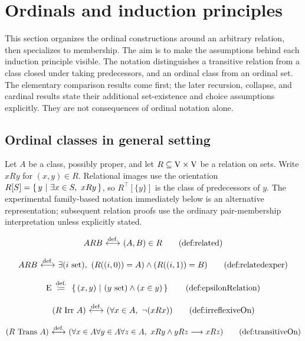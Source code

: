 \def\topic{Ordinals}

\section{Ordinals and induction principles}
This section organizes the ordinal constructions around an arbitrary
relation, then specializes to membership. The aim is to make the assumptions
behind each induction principle visible. The notation distinguishes a
transitive relation from a class closed under taking predecessors, and an
ordinal class from an ordinal set. The elementary comparison results come
first; the later recursion, collapse, and cardinal results state their
additional set-existence and choice assumptions explicitly. They are not
consequences of ordinal notation alone.
\subsection{Ordinal classes in general setting}
Let $A$ be a class, possibly proper, and let
$R\subseteq\mathrm{V}\times\mathrm{V}$ be a relation on sets. Write $xRy$ for
$(x,y)\in R$. Relational images use the orientation
$R[S]=\left\{\,y\ \middle|\ \exists x\in S,\ xRy\,\right\}$, so $R^\top[\{y\}]$ is the class of
predecessors of $y$. The experimental family-based notation immediately
below is an alternative representation; subsequent relation proofs use
the ordinary pair-membership interpretation unless explicitly stated.
\begin{definition}[related]
\[
ARB \iffdef (A,B) \in R
\labeltagd{def}{related}
\]
\end{definition}
\begin{definition*}
\[
ARB \iffdef \exists (i\set),\ (R((i,0))=A)\land(R((i,1))=B)
\labeltagd{def}{relatedexper}
\]
\end{definition*}
\begin{definition}
\[
\E\ \eqdef\ \cc{(x,y)}{(y\set)\land(x\in y)}
\labeltagd{def}{epsilonRelation}
\]
\end{definition}
\begin{definition}[irreflexive on]
\[
(R\mathrm{\ Irr\ }A)\iffdef (\forall x\in A,\ \neg (xRx))
\labeltagd{def}{irreflexiveOn}
\]
\end{definition}
\begin{definition}
\[
(R\mathrm{\ Trans\ }A)\iffdef (\forall x\in A\forall y\in A\forall z\in A,\ %
xRy \land yRz \implies xRz)
\labeltagd{def}{transitiveOn}
\]
\end{definition}


